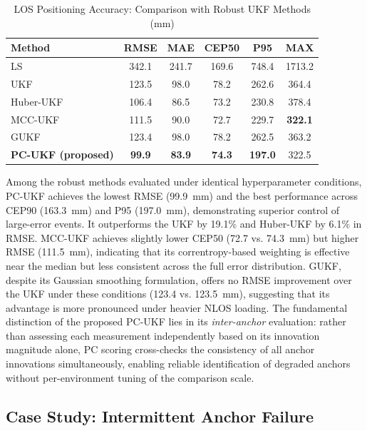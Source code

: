 \documentclass[journal]{IEEEtran}
\begin{document}
\begin{table}[t]
\centering
\caption{LOS Positioning Accuracy: Comparison with Robust UKF Methods (mm)}
\label{tab:sota_comparison}
\renewcommand{\arraystretch}{1.15}
\begin{tabular}{@{}lccccc@{}}
\toprule
\textbf{Method} & \textbf{RMSE} & \textbf{MAE} & \textbf{CEP50} & \textbf{P95} & \textbf{MAX} \\
\midrule
LS                             & 342.1 & 241.7 & 169.6 & 748.4 & 1713.2 \\
\midrule
UKF                         & 123.5 &  98.0 &  78.2 & 262.6 &  364.4 \\
Huber-UKF~\cite{huber_ukf}          & 106.4 &  86.5 &  73.2 & 230.8 &  378.4 \\
MCC-UKF~\cite{mcc_ukf}              & 111.5 &  90.0 &  72.7 & 229.7 & \textbf{322.1} \\
GUKF~\cite{gukf}                    & 123.4 &  98.0 &  78.2 & 262.5 &  363.2 \\
\textbf{PC-UKF (proposed)}           & \textbf{99.9} & \textbf{83.9} & \textbf{74.3} & \textbf{197.0} & 322.5 \\
\bottomrule
\end{tabular}
\end{table}

Among the robust methods evaluated under identical hyperparameter conditions, PC-UKF achieves the lowest RMSE (99.9~mm) and the best performance across CEP90 (163.3~mm) and P95 (197.0~mm), demonstrating superior control of large-error events. It outperforms the UKF by 19.1\% and Huber-UKF by 6.1\% in RMSE. MCC-UKF achieves slightly lower CEP50 (72.7 vs. 74.3~mm) but higher RMSE (111.5~mm), indicating that its correntropy-based weighting is effective near the median but less consistent across the full error distribution. GUKF, despite its Gaussian smoothing formulation, offers no RMSE improvement over the UKF under these conditions (123.4 vs. 123.5~mm), suggesting that its advantage is more pronounced under heavier NLOS loading. The fundamental distinction of the proposed PC-UKF lies in its \emph{inter-anchor} evaluation: rather than assessing each measurement independently based on its innovation magnitude alone, PC scoring cross-checks the consistency of all anchor innovations simultaneously, enabling reliable identification of degraded anchors without per-environment tuning of the comparison scale.

\subsection{Case Study: Intermittent Anchor Failure}
\end{document}
